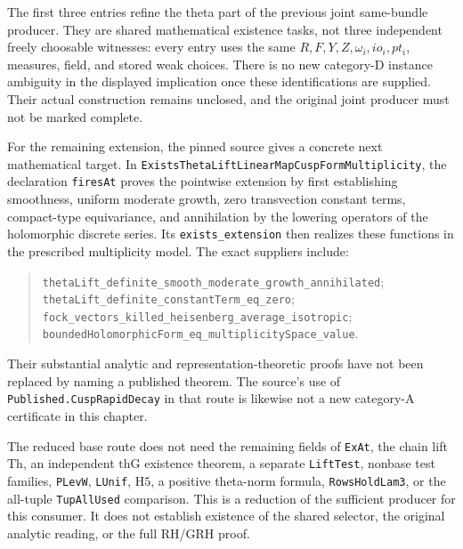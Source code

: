 The first three entries refine the theta part of the
previous joint same-bundle producer.  They are
shared mathematical existence tasks, not three
independent freely choosable witnesses: every
entry uses the same \(R,F,Y,Z,\omega_i,io_i,pt_i\),
measures, field, and stored weak choices.  There
is no new category-D instance ambiguity in the
displayed implication once these identifications
are supplied.  Their actual construction remains
unclosed, and the original joint producer must
not be marked complete.

For the remaining extension, the pinned source gives a
concrete next mathematical target.  In
\texttt{Exists\allowbreak Theta\allowbreak Lift\allowbreak Linear\allowbreak Map\allowbreak Cusp\allowbreak Form\allowbreak Multiplicity},
the declaration \texttt{firesAt}
proves the pointwise extension by first establishing
smoothness, uniform moderate growth, zero transvection
constant terms, compact-type equivariance, and annihilation
by the lowering operators of the holomorphic discrete
series.  Its \texttt{exists\_\allowbreak extension} then realizes
these functions in the prescribed multiplicity model.
The exact suppliers include:
\begin{quote}\small
\texttt{thetaLift\_definite\_smooth\_moderate\_growth\_annihilated};\\
\texttt{thetaLift\_definite\_constantTerm\_eq\_zero};\\
\texttt{fock\_vectors\_killed\_heisenberg\_average\_isotropic};\\
\texttt{boundedHolomorphicForm\_eq\_multiplicitySpace\_value}.
\end{quote}
Their substantial analytic and representation-theoretic
proofs have not been replaced by naming a published
theorem.  The source's use of
\texttt{Published.Cusp\allowbreak Rapid\allowbreak Decay} in that route is
likewise not a new category-A certificate in this chapter.

The reduced base route does not need the remaining
fields of \texttt{Ex\allowbreak At}, the chain lift \(\mathrm{Th}\),
an independent \(\mathrm{thG}\) existence theorem,
a separate \texttt{Lift\allowbreak Test}, nonbase test families,
\texttt{PLev\allowbreak W}, \texttt{LUnif}, \(\mathrm H5\),
a positive theta-norm formula, \texttt{Rows\allowbreak Hold\allowbreak Lam3},
or the all-tuple \texttt{Tup\allowbreak All\allowbreak Used} comparison.
This is a reduction of the sufficient producer for
this consumer.  It does not establish existence
of the shared selector, the original analytic
reading, or the full RH/GRH proof.
